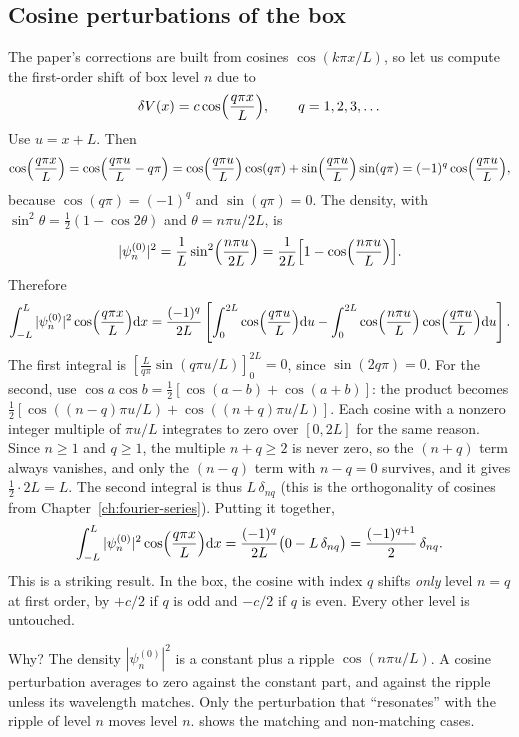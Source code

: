 \subsection{Cosine perturbations of the box}

The paper's corrections are built from cosines $\cos(k\pi x/L)$, so let us compute the first-order shift of box level $n$ due to
\[
\delta V(x)=c\cos\Bigl(\frac{q\pi x}{L}\Bigr),\qquad q=1,2,3,\dots
\]
Use $u=x+L$. Then
\[
\cos\Bigl(\frac{q\pi x}{L}\Bigr)=\cos\Bigl(\frac{q\pi u}{L}-q\pi\Bigr)
=\cos\Bigl(\frac{q\pi u}{L}\Bigr)\cos(q\pi)+\sin\Bigl(\frac{q\pi u}{L}\Bigr)\sin(q\pi)
=(-1)^q\cos\Bigl(\frac{q\pi u}{L}\Bigr),
\]
because $\cos(q\pi)=(-1)^q$ and $\sin(q\pi)=0$. The density, with $\sin^2\theta=\tfrac12(1-\cos2\theta)$ and $\theta=n\pi u/2L$, is
\[
|\psi_n^{(0)}|^2=\frac1L\sin^2\Bigl(\frac{n\pi u}{2L}\Bigr)=\frac{1}{2L}\Bigl[1-\cos\Bigl(\frac{n\pi u}{L}\Bigr)\Bigr].
\]
Therefore
\begin{equation}
\int_{-L}^{L}|\psi_n^{(0)}|^2\cos\Bigl(\frac{q\pi x}{L}\Bigr)\mathrm{d} x
=\frac{(-1)^q}{2L}\left[\int_0^{2L}\cos\Bigl(\frac{q\pi u}{L}\Bigr)\mathrm{d} u-\int_0^{2L}\cos\Bigl(\frac{n\pi u}{L}\Bigr)\cos\Bigl(\frac{q\pi u}{L}\Bigr)\mathrm{d} u\right].
\label{eq:perturbation-cosint}
\end{equation}
The first integral is $[\tfrac{L}{q\pi}\sin(q\pi u/L)]_0^{2L}=0$, since $\sin(2q\pi)=0$. For the second, use $\cos a\cos b=\tfrac12[\cos(a-b)+\cos(a+b)]$: the product becomes $\tfrac12[\cos((n-q)\pi u/L)+\cos((n+q)\pi u/L)]$. Each cosine with a nonzero integer multiple of $\pi u/L$ integrates to zero over $[0,2L]$ for the same reason. Since $n\ge1$ and $q\ge1$, the multiple $n+q\ge2$ is never zero, so the $(n+q)$ term always vanishes, and only the $(n-q)$ term with $n-q=0$ survives, and it gives $\tfrac12\cdot 2L=L$. The second integral is thus $L\,\delta_{nq}$ (this is the orthogonality of cosines from Chapter~\ref{ch:fourier-series}). Putting it together,
\begin{equation}
\int_{-L}^{L}|\psi_n^{(0)}|^2\cos\Bigl(\frac{q\pi x}{L}\Bigr)\mathrm{d} x=\frac{(-1)^q}{2L}\bigl(0-L\,\delta_{nq}\bigr)=\frac{(-1)^{q+1}}{2}\,\delta_{nq}.
\label{eq:perturbation-boxcos}
\end{equation}
This is a striking result. In the box, the cosine with index $q$ shifts \emph{only} level $n=q$ at first order, by $+c/2$ if $q$ is odd and $-c/2$ if $q$ is even. Every other level is untouched.

Why? The density $|\psi_n^{(0)}|^2$ is a constant plus a ripple $\cos(n\pi u/L)$. A cosine perturbation averages to zero against the constant part, and against the ripple unless its wavelength matches. Only the perturbation that ``resonates'' with the ripple of level $n$ moves level $n$.  shows the matching and non-matching cases.

